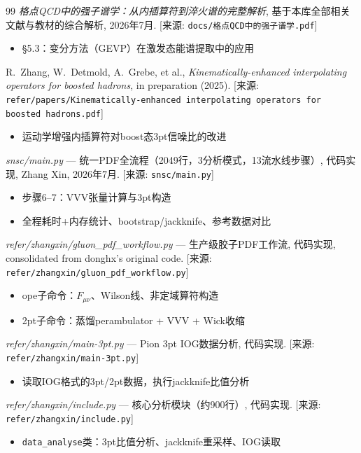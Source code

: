 \documentclass[12pt,a4paper]{ctexart}
\theoremstyle{definition}
\begin{document}
\begin{thebibliography}{99}
\textit{格点QCD中的强子谱学：从内插算符到淬火谱的完整解析},
基于本库全部相关文献与教材的综合解析, 2026年7月.
[来源: \texttt{docs/格点QCD中的强子谱学.pdf}]
\begin{itemize}
    \item §5.3：变分方法（GEVP）在激发态能谱提取中的应用
\end{itemize}

R.~Zhang, W.~Detmold, A.~Grebe, et al.,
\textit{Kinematically-enhanced interpolating operators for boosted hadrons},
in preparation (2025).
[来源: \texttt{refer/papers/Kinematically-enhanced interpolating operators for boosted hadrons.pdf}]
\begin{itemize}
    \item 运动学增强内插算符对boost态3pt信噪比的改进
\end{itemize}

\textit{snsc/main.py} — 统一PDF全流程（2049行，3分析模式，13流水线步骤）,
代码实现, Zhang Xin, 2026年7月.
[来源: \texttt{snsc/main.py}]
\begin{itemize}
    \item 步骤6--7：VVV张量计算与3pt构造
    \item 全程耗时+内存统计、bootstrap/jackknife、参考数据对比
\end{itemize}

\textit{refer/zhangxin/gluon\_pdf\_workflow.py} — 生产级胶子PDF工作流,
代码实现, consolidated from donghx's original code.
[来源: \texttt{refer/zhangxin/gluon\_pdf\_workflow.py}]
\begin{itemize}
    \item ope子命令：$F_{\mu\nu}$、Wilson线、非定域算符构造
    \item 2pt子命令：蒸馏perambulator + VVV + Wick收缩
\end{itemize}

\textit{refer/zhangxin/main-3pt.py} — Pion 3pt IOG数据分析,
代码实现.
[来源: \texttt{refer/zhangxin/main-3pt.py}]
\begin{itemize}
    \item 读取IOG格式的3pt/2pt数据，执行jackknife比值分析
\end{itemize}

\textit{refer/zhangxin/include.py} — 核心分析模块（约900行）,
代码实现.
[来源: \texttt{refer/zhangxin/include.py}]
\begin{itemize}
    \item \texttt{data\_analyse}类：3pt比值分析、jackknife重采样、IOG读取
\end{itemize}

\end{thebibliography}
\end{document}
